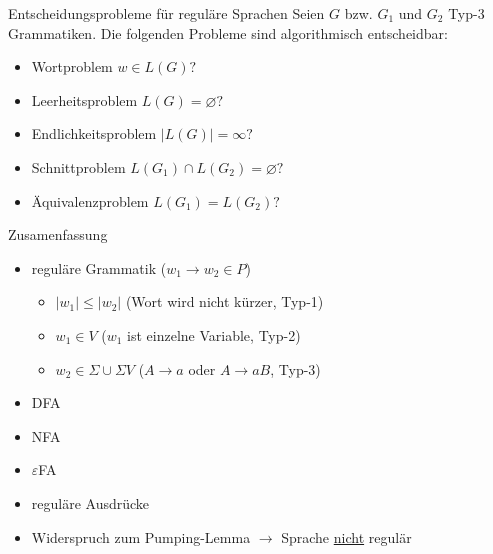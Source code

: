 \begin{frame}{Entscheidungsprobleme für reguläre Sprachen}
	Seien $G$ bzw. $G_1$ und $G_2$ Typ-3 Grammatiken. Die folgenden
	Probleme sind algorithmisch entscheidbar:
	\begin{itemize}
		\item Wortproblem $w \in L(G)?$
		\item Leerheitsproblem $L(G) = \varnothing?$
		\item Endlichkeitsproblem $|L(G)|=\infty ?$
		\item Schnittproblem $L(G_1) \cap L(G_2) = \varnothing ?$
		\item Äquivalenzproblem $L(G_1) = L(G_2)?$
	\end{itemize}
\end{frame}

\begin{frame}{Zusamenfassung}
	\begin{itemize}
		\item reguläre Grammatik ($w_1 \rightarrow w_2 \in P$)
		\begin{itemize}
			\item $|w_1|\leq|w_2|$ (Wort wird nicht kürzer, Typ-1)
			\item $w_1 \in V$ ($w_1$ ist einzelne Variable, Typ-2)
			\item $w_2 \in \Sigma \cup \Sigma V$ ($A \rightarrow a$ oder $A \rightarrow aB$, Typ-3)
		\end{itemize}
		\item DFA
		\item NFA
		\item $\varepsilon$FA
		\item reguläre Ausdrücke
		\item Widerspruch zum Pumping-Lemma $\rightarrow$ Sprache \underline{nicht} regulär
	\end{itemize}
\end{frame}